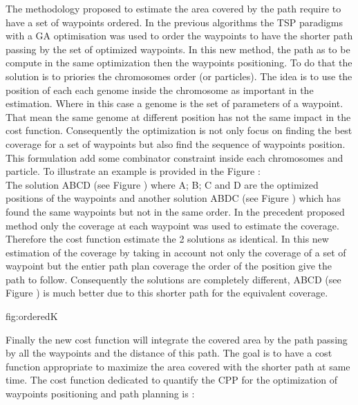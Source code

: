 The methodology proposed to estimate the area covered by the path require to have a set of waypoints ordered.  In the previous algorithms the TSP paradigms with a GA optimisation was used to order the waypoints to have the shorter path passing by the set of optimized waypoints. In this new method, the path as to be compute in the same optimization then the waypoints positioning. 
To do that the solution is to priories the chromosomes order (or particles). The idea is to use the position of each each genome inside the chromosome as important in the estimation. Where in this case a genome is the set of parameters of a waypoint. That mean the same genome at different position has not the same impact in the cost function. Consequently the optimization is not only focus on finding the best coverage for a set of waypoints but also find the sequence of waypoints position. This formulation add some combinator constraint inside each chromosomes and particle.
To illustrate an example is provided in the Figure  : \\
The solution ABCD (see Figure ) where A; B; C and D are the optimized positions of the waypoints and another solution  ABDC (see Figure ) which has found the same waypoints but not in the same order. In the precedent proposed method only the coverage at each waypoint was used to estimate the coverage. Therefore the cost function estimate the 2 solutions as identical. 
In this new estimation of the coverage by taking in account not only the coverage of a set of waypoint but the entier path plan coverage the order of the position give the path to follow. Consequently the solutions are completely different, ABCD (see Figure ) is much better due to this shorter path for the equivalent coverage.
  \begin{mfigures}[!]{}{fig:orderedK} \centering
\end{mfigures}   

 Finally the new cost function will integrate the covered area by the path passing  by all the waypoints and the distance of this path. The goal is to have a cost function appropriate to maximize the area covered with the shorter path at same time.
 The cost function dedicated to quantify the CPP for the optimization of waypoints positioning and path planning is :
 
